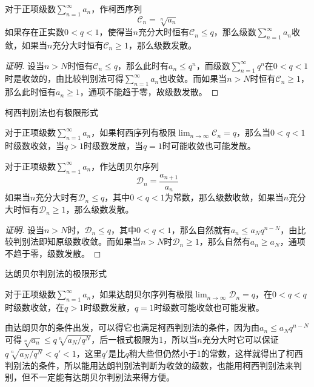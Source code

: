 \begin{theorem}[柯西判别法]
  对于正项级数$\sum_{n=1}^{\infty}a_n$，作柯西序列
  \[ \mathcal{C}_n = \sqrt[n]{a_n} \]
  如果存在正实数$0<q<1$，使得当$n$充分大时恒有$\mathcal{C}_n \leqslant q$，那么级数$\sum_{n=1}^{\infty}a_n$收敛，如果当$n$充分大时恒有$\mathcal{C}_n \geqslant 1$，那么级数发散。
\end{theorem}

\begin{proof}[证明]
  设当$n>N$时恒有$\mathcal{C}_n \leqslant q$，那么此时有$a_n \leqslant q^n$，而级数$\sum_{n=1}^{\infty}q^n$在$0<q<1$时是收敛的，由比较判别法可得$\sum_{n=1}^{\infty}a_n$也收敛。而如果当$n>N$时恒有$\mathcal{C}_n \geqslant 1$，那么此时恒有$a_n \geqslant 1$，通项不能趋于零，故级数发散。
\end{proof}

柯西判别法也有极限形式
\begin{inference}
  对于正项级数$\sum_{n=1}^{\infty}a_n$，如果柯西序列有极限$\lim_{n \to \infty} \mathcal{C}_n=q$，那么当$0<q<1$时级数收敛，当$q>1$时级数发散，当$q=1$时可能收敛也可能发散。
\end{inference}

\begin{theorem}[达朗贝尔判别法]
  对于正项级数$\sum_{n=1}^{\infty}a_n$，作达朗贝尔序列
  \[ \mathcal{D}_n = \frac{a_{n+1}}{a_n} \]
  如果当$n$充分大时有$\mathcal{D}_n \leqslant q$，其中$0<q<1$为常数，那么级数收敛，如果当$n$充分大时恒有$\mathcal{D}_n \geqslant 1$，那么级数发散。
\end{theorem}

\begin{proof}[证明]
  设当$n>N$时，$\mathcal{D}_n \leqslant q$，其中$0<q<1$，那么自然就有$a_n \leqslant a_N q^{n-N}$，由比较判别法即知原级数收敛。而如果当$n>N$时$\mathcal{D}_n \geqslant 1$，那么自然有$a_n \geqslant a_N$，通项不趋于零，级数发散。
\end{proof}

达朗贝尔判别法的极限形式
\begin{inference}
  对于正项级数$\sum_{n=1}^{\infty}a_n$，如果达朗贝尔序列有极限$\lim_{n \to \infty} \mathcal{D}_n = q$，在$0<q<q$时级数收敛，在$q>1$时级数发散，$q=1$时级数可能收敛也可能发散。
\end{inference}

由达朗贝尔的条件出发，可以得它也满足柯西判别法的条件，因为由$a_n \leqslant a_N q^{n-N}$可得$\sqrt[n]{a_n} \leqslant q \sqrt[n]{a_N/q^N}$，后一根式极限为1，所以当$n$充分大时它可以保证$q \sqrt[n]{a_N/q^N}<q'<1$，这里$q'$是比$q$稍大些但仍然小于1的常数，这样就得出了柯西判别法的条件，所以能用达朗判别法判断为收敛的级数，也能用柯西判别法来判别，但不一定能有达朗贝尔判别法来得方便。


